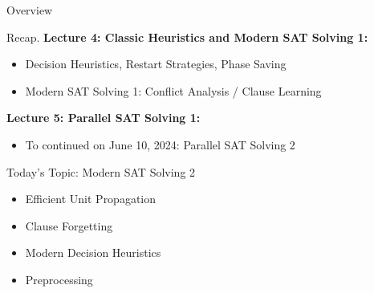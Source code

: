 \documentclass[t]{sdqbeamer}
\begin{document}
\begin{frame}{Overview}
    \begin{block}{Recap.}
        \textbf{Lecture 4: Classic Heuristics and Modern SAT Solving 1:}
        \begin{itemize}\setlength{\itemsep}{1ex}
            \item Decision Heuristics, Restart Strategies, Phase Saving
            \item Modern SAT Solving 1: Conflict Analysis / Clause Learning
        \end{itemize}
        \textbf{Lecture 5: Parallel SAT Solving 1:}
        \begin{itemize}\setlength{\itemsep}{1ex}
            \item To continued on June 10, 2024: Parallel SAT Solving 2
        \end{itemize}
    \end{block}
    \pause
	\begin{block}{Today's Topic: Modern SAT Solving 2}
		\begin{itemize}\setlength{\itemsep}{1ex}
			\item Efficient Unit Propagation
			\item Clause Forgetting
			\item Modern Decision Heuristics
			\item Preprocessing
		\end{itemize}
	\end{block}
\end{frame}
\end{document}
